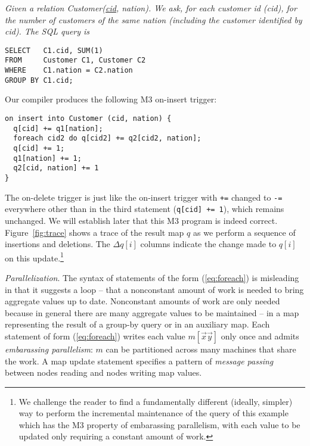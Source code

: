 \begin{example}\em
\label{ex:self-join}
Given a relation Customer(\underline{cid}, nation).
We ask, for each customer id (cid),
for the number of customers of the same nation (including the customer
identified by cid).
The SQL query is
\begin{verbatim}
SELECT   C1.cid, SUM(1)
FROM     Customer C1, Customer C2
WHERE    C1.nation = C2.nation
GROUP BY C1.cid;
\end{verbatim}
Our compiler produces the following M3 on-insert trigger:
\begin{verbatim}
on insert into Customer (cid, nation) {
  q[cid] += q1[nation];
  foreach cid2 do q[cid2] += q2[cid2, nation];
  q[cid] += 1;
  q1[nation] += 1;
  q2[cid, nation] += 1
}
\end{verbatim}
The on-delete trigger is just like the on-insert trigger with {\tt +=}
changed to {\tt -=} everywhere other than in the third statement
({\tt q[cid] += 1}), which remains unchanged.
We will establish later that this M3 program is indeed correct.
Figure~\ref{fig:trace} shows a trace of the result map $q$ as we perform
a sequence of insertions and deletions. The $\Delta q[i]$ columns
indicate the change made to $q[i]$ on this update.\footnote{We
challenge the reader to find a 
fundamentally different (ideally, simpler) way to
perform the incremental maintenance of the query of this example
which has the M3 property of embarassing parallelism, with each value
to be updated only requiring a constant amount of work.}
\punto
\end{example}


{\em Parallelization}.
The syntax of statements of the form (\ref{eq:foreach})
is misleading in that it suggests a loop --
that a nonconstant amount of work is needed to bring aggregate
values up to date. Nonconstant amounts of work are only needed
because in general there are many aggregate values
to be maintained -- in a
map representing the result of a group-by query or in an auxiliary map.
Each statement of form (\ref{eq:foreach})
writes each value $m[\vec{x}\vec{y}]$ only once and admits
{\em embarassing parallelism}: $m$ can be partitioned across many machines
that share the work. A map update statement specifies a
pattern of {\em message passing} between nodes reading and nodes writing
map values.



